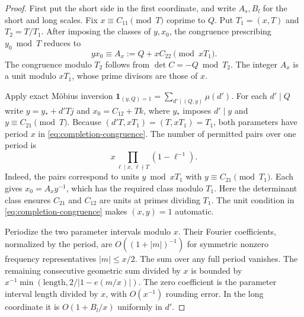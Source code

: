\documentclass[11pt]{amsart}
\numberwithin{equation}{section}
\theoremstyle{remark}
\begin{document}
\begin{proof}
First put the short side in the first coordinate, and write $A_s,B_l$
for the short and long scales. Fix $x\equiv C_{11}\pmod T$ coprime
to $Q$. Put $T_1=(x,T)$ and $T_2=T/T_1$. After imposing the classes
of $y,x_0$, the congruence prescribing $y_0\bmod T$ reduces to
\begin{equation}\label{eq:completion-congruence}
 yx_0\equiv A_x:=Q+xC_{22}\pmod{xT_1}.
\end{equation}
The congruence modulo $T_2$ follows from $\det C=-Q\bmod T_2$.
The integer $A_x$ is a unit modulo $xT_1$, whose prime divisors are
those of $x$.

Apply exact M\"obius inversion
$\mathbf1_{(y,Q)=1}=\sum_{d'\mid(Q,y)}\mu(d')$. For each $d'\mid Q$
write $y=y_*+d'Tj$ and $x_0=C_{12}+Tk$, where $y_*$ imposes
$d'\mid y$ and $y\equiv C_{21}\pmod T$. Because
$(d'T,xT_1)=(T,xT_1)=T_1$, both parameters have period $x$ in
\eqref{eq:completion-congruence}. The number of permitted pairs
over one period is
\begin{equation}\label{eq:zero-frequency-count}
 x\prod_{\ell\mid x,\,\ell\nmid T}(1-\ell^{-1}).
\end{equation}
Indeed, the pairs correspond to units $y\bmod xT_1$ with
$y\equiv C_{21}\pmod{T_1}$. Each gives $x_0=A_xy^{-1}$, which has
the required class modulo $T_1$. Here the determinant class ensures
$C_{21}$ and $C_{12}$ are units at primes dividing $T_1$. The unit
condition in \eqref{eq:completion-congruence} makes $(x,y)=1$ automatic.

Periodize the two parameter intervals modulo $x$. Their Fourier
coefficients, normalized by the period, are $O((1+|m|)^{-1})$ for
symmetric nonzero frequency representatives $|m|\leq x/2$.
The sum over any full period vanishes. The remaining consecutive
geometric sum divided by $x$ is bounded by
$x^{-1}\min(\text{length},2/|1-e(m/x)|)$. The zero coefficient is
the parameter interval length divided by $x$, with $O(x^{-1})$
rounding error. In the long coordinate it is $O(1+B_l/x)$ uniformly
in $d'$.


\end{proof}
\end{document}
